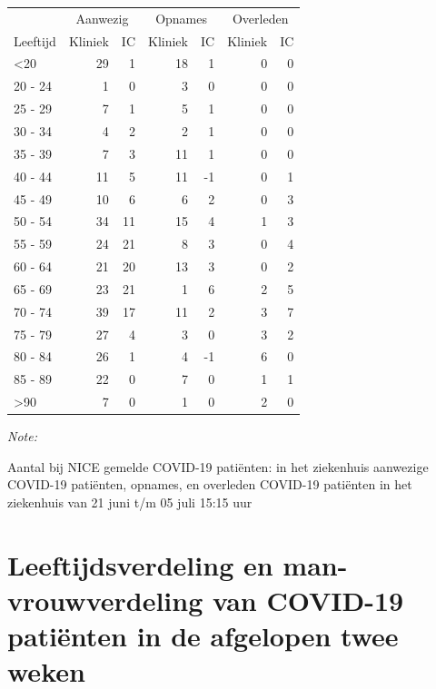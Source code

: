 \documentclass[
  english,
  man,floatsintext]{apa6}
\begin{document}
\begin{table}
\centering\begingroup\fontsize{10}{12}\selectfont

\begin{threeparttable}
\begin{tabular}{lrrrrrr}
\toprule
\multicolumn{1}{c}{ } & \multicolumn{2}{c}{Aanwezig} & \multicolumn{2}{c}{Opnames} & \multicolumn{2}{c}{Overleden} \\
\cmidrule(l{3pt}r{3pt}){2-3} \cmidrule(l{3pt}r{3pt}){4-5} \cmidrule(l{3pt}r{3pt}){6-7}
Leeftijd & Kliniek & IC & Kliniek & IC & Kliniek & IC\\
\midrule
<20 & 29 & 1 & 18 & 1 & 0 & 0\\
20 - 24 & 1 & 0 & 3 & 0 & 0 & 0\\
25 - 29 & 7 & 1 & 5 & 1 & 0 & 0\\
30 - 34 & 4 & 2 & 2 & 1 & 0 & 0\\
35 - 39 & 7 & 3 & 11 & 1 & 0 & 0\\
40 - 44 & 11 & 5 & 11 & -1 & 0 & 1\\
45 - 49 & 10 & 6 & 6 & 2 & 0 & 3\\
50 - 54 & 34 & 11 & 15 & 4 & 1 & 3\\
55 - 59 & 24 & 21 & 8 & 3 & 0 & 4\\
60 - 64 & 21 & 20 & 13 & 3 & 0 & 2\\
65 - 69 & 23 & 21 & 1 & 6 & 2 & 5\\
70 - 74 & 39 & 17 & 11 & 2 & 3 & 7\\
75 - 79 & 27 & 4 & 3 & 0 & 3 & 2\\
80 - 84 & 26 & 1 & 4 & -1 & 6 & 0\\
85 - 89 & 22 & 0 & 7 & 0 & 1 & 1\\
>90 & 7 & 0 & 1 & 0 & 2 & 0\\
\bottomrule
\end{tabular}
\begin{tablenotes}
\item \textit{Note: } 
\item Aantal bij NICE gemelde COVID-19 patiënten: in het ziekenhuis aanwezige COVID-19 patiënten, opnames, en overleden COVID-19 patiënten in het ziekenhuis van 21 juni t/m 05 juli 15:15 uur
\end{tablenotes}
\end{threeparttable}
\endgroup{}
\end{table}

\newpage

\hypertarget{leeftijdsverdeling-en-man-vrouwverdeling-van-covid-19-patiuxebnten-in-de-afgelopen-twee-weken}{%
\section{Leeftijdsverdeling en man-vrouwverdeling van COVID-19 patiënten in de afgelopen twee weken}\label{leeftijdsverdeling-en-man-vrouwverdeling-van-covid-19-patiuxebnten-in-de-afgelopen-twee-weken}}
\end{document}
